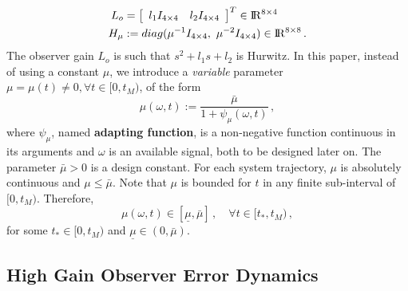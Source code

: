 \documentclass[letterpaper, 10 pt, journal, twocolumn]{IEEEtran}  %
\def\re{{\rm I}\! {\rm R}}
\theoremstyle{plain}
\theoremstyle{definition}
\theoremstyle{remark}
\newtheorem*{remark}{Remark}
\begin{document}
%
\begin{subequations}
	\label{eq:defLhgo_and_Hhgo}
	\begin{align}
		L_o &= \left[\begin{array}{cc}  l_1 I_{4 \times 4} & l_2 I_{4 \times 4} \end{array} \right]^T \in \re^{8 \times 4} 
		\\
		H_\mu &:= \mbox{diag}(\mu^{-1}  I_{4 \times 4}, \ \mu^{-2} I_{4 \times 4}) \in \re^{8 \times 8}\,.
	\end{align}
\end{subequations}
%
%
%
The observer gain $L_o$ is such that $s^{2}+l_1
s+ l_2$ is Hurwitz. In this paper,
instead of using a constant $\mu$, we introduce a {\em variable}
parameter $\mu=\mu(t)\neq\!0, \forall t\in[0,t_M)$, %
of the form
%
\begin{equation}
\mu(\omega,t):=\frac{\bar{\mu}}{1+
\psi_\mu(\omega,t)}\,,\label{eq:def_mu}
\end{equation}
%
where $\psi_\mu$, named \textbf{adapting function}, is a
non-negative function continuous in its
arguments and $\omega$ is an available signal, both to be designed later on. The parameter $\bar{\mu}\!>\!0$ is a design constant. For each
system trajectory, $\mu$ is absolutely continuous and
$\mu\!\leq\!\bar{\mu}$. Note that $\mu$ is bounded for $t$ in any
finite sub-interval of $[0,t_M)$. Therefore,
%
\begin{equation}
\mu(\omega,t)\in[\underline{\mu},\bar{\mu}]\,, \quad \forall
t\!\in\![t_*,t_M)\,, \label{eq:P3}
\end{equation}
%
for some $t_* \in [0,t_M)$ and
$\underline{\mu}\!\in\!(0,\bar{\mu})$. 



\subsection{High Gain Observer Error Dynamics}
\end{document}
